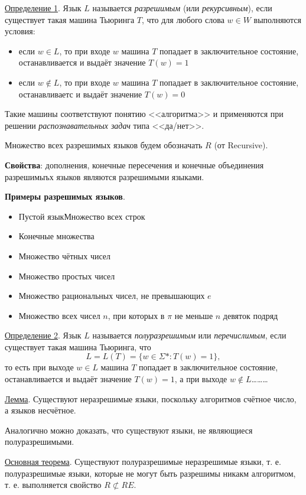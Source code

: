 \documentclass{article}
\begin{document}
\underline{Определение 1}. Язык $L$ называется \textit{разрешимым} (или \textit{рекурсивным}), если существует такая машина Тьюринга $T$, что для любого слова $w \in W$ выполняются условия:
\begin{itemize}
    \item если $w \in L$, то при входе $w$ машина $T$ попадает в заключительное состояние, останавливается и выдаёт значение $T(w) = 1$
    \item если $w \not \in L$, то при входе $w$ машина $T$ попадает в заключительное состояние, останавливаетс и выдаёт значение $T(w) = 0$
\end{itemize}

Такие машины соответствуют понятию <<алгоритма>> и применяются при решении \textit{распознавательных задач} типа <<да/нет>>.

Множество всех разрешимых языков будем обозначать $R$ (от Recursive).

\textbf{Свойства}: дополнения, конечные пересечения и конечные объединения разрешимыъх языков являются разрешимыми языками.

\textbf{Примеры разрешимых языков}.
\begin{itemize}
    \item Пустой языкМножество всех строк
    \item Конечные множества
    \item Множество чётных чисел
    \item Множество простых чисел
    \item Множество рациональных чисел, не превышающих $e$
    \item Множество всех чисел $n$, при которых в $\pi$ не меньше $n$ девяток подряд
\end{itemize}

\underline{Определение 2}. Язык $L$ называется \textit{полуразрешимым} или \textit{перечислимым}, если существует такая машина Тьюринга, что
\begin{equation}
    L = L(T) = \{w \in \Sigma* : T(w) = 1\},
\end{equation}
то есть при выходе $w \in L$ машина $T$ попадает в заключительное состояние, останавливается и выдаёт значение $T(w) = 1$, а при выходе $w \not \in L$\dots\dots\dots

\underline{Лемма}. Существуют неразрешимые языки, поскольку алгоритмов счётное число, а языков несчётное.

Аналогично можно доказать, что существуют языки, не являющиеся полуразрешимыми.

\underline{Основная теорема}. Существуют полуразрешимые неразрешимые языки, т. е. полуразрешимые языки, которые не могут быть разрешимы никакм алгоритмом, т. е. выполняется свойство $R \not \subset RE$.
\end{document}
